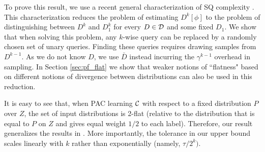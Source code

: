 To prove this result, we use a recent general characterization of SQ complexity \cite{Feldman:16sqd}. This characterization reduces the problem of estimating $D^k[\phi]$ to the problem of distinguishing between $D^k$ and $D_1^k$ for every $D \in \mathcal{D}$ and some fixed $D_1$. We show that when solving this problem, any $k$-wise query can be replaced by a randomly chosen set of unary queries. Finding these queries requires drawing samples from $D^{k-1}$. As we do not know $D$, we use $\bar{D}$ instead incurring the $\gamma^{k-1}$ overhead in sampling. In Section \ref{sec:pf_flat} we show that weaker notions of ``flatness" based on different notions of divergence between distributions can also be used in this reduction.

It is easy to see that, when PAC learning $\mathcal{C}$ with respect to a fixed distribution $P$ over $Z$, the set of input distributions is 2-flat (relative to the distribution that is equal to $P$ on $Z$ and gives equal weight $1/2$ to each label). Therefore, our result generalizes the results in \cite{blum2003noise}. More importantly, the tolerance in our upper bound scales linearly with $k$ rather than exponentially (namely, $\tau/2^k)$.

